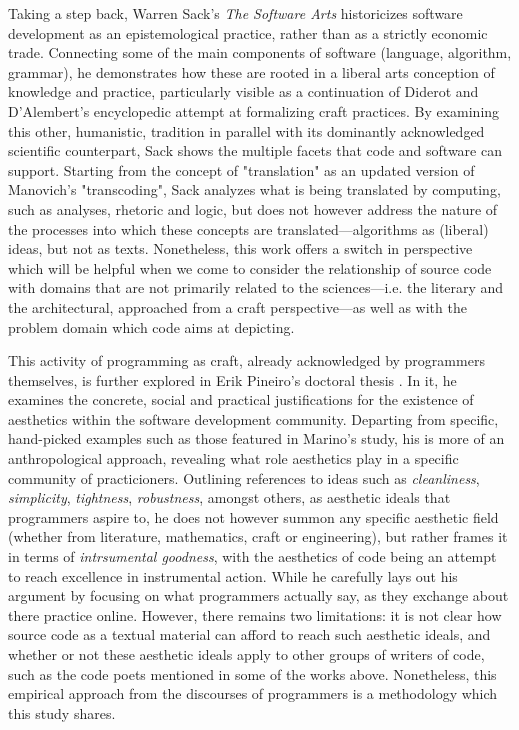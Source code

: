 Taking a step back, Warren Sack's \emph{The Software Arts} \citep{sack_software_2019} historicizes software development as an epistemological practice, rather than as a strictly economic trade. Connecting some of the main components of software (language, algorithm, grammar), he demonstrates how these are rooted in a liberal arts conception of knowledge and practice, particularly visible as a continuation of Diderot and D'Alembert's encyclopedic attempt at formalizing craft practices. By examining this other, humanistic, tradition in parallel with its dominantly acknowledged scientific counterpart, Sack shows the multiple facets that code and software can support. Starting from the concept of "translation" as an updated version of Manovich's "transcoding", Sack analyzes what is being translated by computing, such as analyses, rhetoric and logic, but does not however address the nature of the processes into which these concepts are translated—algorithms as (liberal) ideas, but not as texts. Nonetheless, this work offers a switch in perspective which will be helpful when we come to consider the relationship of source code with domains that are not primarily related to the sciences—i.e. the literary and the architectural, approached from a craft perspective—as well as with the problem domain which code aims at depicting.

This activity of programming as craft, already acknowledged by programmers themselves, is further explored in Erik Pineiro's doctoral thesis \citep{pineiro_aesthetics_2003}. In it, he examines the concrete, social and practical justifications for the existence of aesthetics within the software development community. Departing from specific, hand-picked examples such as those featured in Marino's study, his is more of an anthropological approach, revealing what role aesthetics play in a specific community of practicioners. Outlining references to ideas such as \emph{cleanliness}, \emph{simplicity}, \emph{tightness}, \emph{robustness}, amongst others, as aesthetic ideals that programmers aspire to, he does not however summon any specific aesthetic field (whether from literature, mathematics, craft or engineering), but rather frames it in terms of \emph{intrsumental goodness}, with the aesthetics of code being an attempt to reach excellence in instrumental action. While he carefully lays out his argument by focusing on what programmers actually say, as they exchange about there practice online. However, there remains two limitations: it is not clear how source code as a textual material can afford to reach such aesthetic ideals, and whether or not these aesthetic ideals apply to other groups of writers of code, such as the code poets mentioned in some of the works above. Nonetheless, this empirical approach from the discourses of programmers is a methodology which this study shares.

